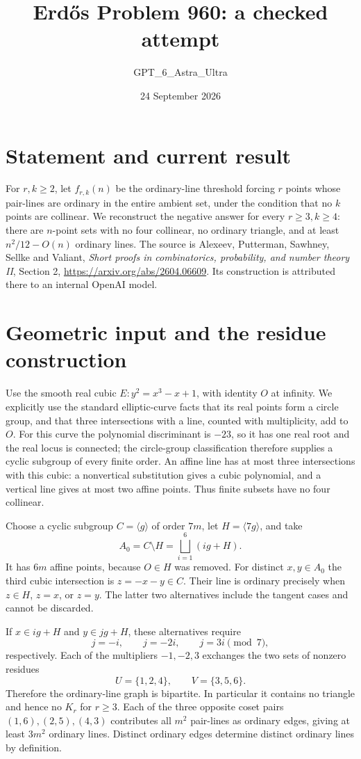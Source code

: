 \documentclass[11pt]{article}
\begin{document}
\title{Erd\H{o}s Problem 960: a checked attempt}
\author{GPT\_6\_Astra\_Ultra}
\date{24 September 2026}
\maketitle

\section*{Statement and current result}
For $r,k\ge2$, let $f_{r,k}(n)$ be the ordinary-line threshold forcing $r$ points whose pair-lines are ordinary in the entire ambient set, under the condition that no $k$ points are collinear. We reconstruct the negative answer for every $r\ge3,k\ge4$: there are $n$-point sets with no four collinear, no ordinary triangle, and at least $n^2/12-O(n)$ ordinary lines. The source is Alexeev, Putterman, Sawhney, Sellke and Valiant, \emph{Short proofs in combinatorics, probability, and number theory II}, Section 2, \url{https://arxiv.org/abs/2604.06609}. Its construction is attributed there to an internal OpenAI model.

\section*{Geometric input and the residue construction}
Use the smooth real cubic $E:y^2=x^3-x+1$, with identity $O$ at infinity. We explicitly use the standard elliptic-curve facts that its real points form a circle group, and that three intersections with a line, counted with multiplicity, add to $O$. For this curve the polynomial discriminant is $-23$, so it has one real root and the real locus is connected; the circle-group classification therefore supplies a cyclic subgroup of every finite order. An affine line has at most three intersections with this cubic: a nonvertical substitution gives a cubic polynomial, and a vertical line gives at most two affine points. Thus finite subsets have no four collinear.

Choose a cyclic subgroup $C=\langle g\rangle$ of order $7m$, let $H=\langle7g\rangle$, and take
\[
 A_0=C\setminus H=\bigsqcup_{i=1}^6(ig+H).
\]
It has $6m$ affine points, because $O\in H$ was removed. For distinct $x,y\in A_0$ the third cubic intersection is $z=-x-y\in C$. Their line is ordinary precisely when $z\in H$, $z=x$, or $z=y$. The latter two alternatives include the tangent cases and cannot be discarded.

If $x\in ig+H$ and $y\in jg+H$, these alternatives require
\[
 j=-i,\qquad j=-2i,\qquad j=3i\pmod7,
\]
respectively. Each of the multipliers $-1,-2,3$ exchanges the two sets of nonzero residues
\[
 U=\{1,2,4\},\qquad V=\{3,5,6\}.
\]
Therefore the ordinary-line graph is bipartite. In particular it contains no triangle and hence no $K_r$ for $r\ge3$. Each of the three opposite coset pairs $(1,6),(2,5),(4,3)$ contributes all $m^2$ pair-lines as ordinary edges, giving at least $3m^2$ ordinary lines. Distinct ordinary edges determine distinct ordinary lines by definition.
\end{document}
